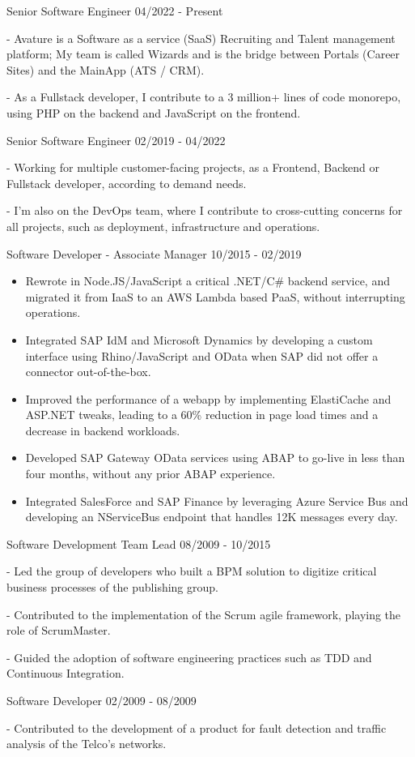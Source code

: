 \documentclass[11pt]{article} %
\begin{document}
\begin{description}
\squish
{}
           {Senior Software Engineer}
           {04/2022 - Present}

- Avature is a Software as a service (SaaS) Recruiting and Talent management platform; My team is called Wizards and is the bridge between Portals (Career Sites) and the MainApp (ATS / CRM).

- As a Fullstack developer, I contribute to a 3 million+ lines of code monorepo, using PHP on the backend and JavaScript on the frontend.

           {Senior Software Engineer}
           {02/2019 - 04/2022}

- Working for multiple customer-facing projects, as a Frontend, Backend or Fullstack developer, according to demand needs.

- I'm also on the DevOps team, where I contribute to cross-cutting concerns for all projects, such as deployment, infrastructure and operations.

           {Software Developer - Associate Manager}
           {10/2015 - 02/2019}

\begin{itemize}
\item Rewrote in Node.JS/JavaScript a critical .NET/C\# backend service, and migrated it from IaaS to an AWS Lambda based PaaS, without interrupting operations.
\item Integrated SAP IdM and Microsoft Dynamics by developing a custom interface using Rhino/JavaScript and OData when SAP did not offer a connector out-of-the-box.
\item Improved the performance of a webapp by implementing ElastiCache and ASP.NET tweaks, leading to a 60\% reduction in page load times and a decrease in backend workloads.
\item Developed SAP Gateway OData services using ABAP to go-live in less than four months, without any prior ABAP experience.
\item Integrated SalesForce and SAP Finance by leveraging Azure Service Bus and developing an NServiceBus endpoint that handles 12K messages every day.
\end{itemize}

           {Software Development Team Lead}
           {08/2009 - 10/2015}

- Led the group of developers who built a BPM solution to digitize critical business processes of the publishing group.

- Contributed to the implementation of the Scrum agile framework, playing the role of ScrumMaster.

- Guided the adoption of software engineering practices such as TDD and Continuous Integration.

           {Software Developer}
           {02/2009 - 08/2009}

- Contributed to the development of a product for fault detection and traffic analysis of the Telco's networks.

\end{description}
\end{document}
